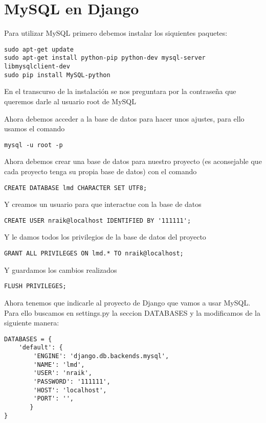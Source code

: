 \section{MySQL en Django}

Para utilizar MySQL primero debemos instalar los siquientes paquetes:

\lstset{
  language=Bash,
}
\begin{lstlisting}
sudo apt-get update
sudo apt-get install python-pip python-dev mysql-server libmysqlclient-dev
sudo pip install MySQL-python
\end{lstlisting}


En el transcurso de la instalación se nos preguntara por la contraseña que queremos darle al usuario root de MySQL

Ahora debemos acceder a la base de datos para hacer unos ajustes, para ello usamos el comando


\begin{lstlisting}
mysql -u root -p
\end{lstlisting}

Ahora debemos crear una base de datos para nuestro proyecto (es aconsejable que cada proyecto tenga su propia base de datos) con el comando


\lstset{
  language=sql,
}
\begin{lstlisting}
CREATE DATABASE lmd CHARACTER SET UTF8;
\end{lstlisting}

Y creamos un usuario para que interactue con la base de datos

\begin{lstlisting}
CREATE USER nraik@localhost IDENTIFIED BY '111111';
\end{lstlisting}


Y le damos todos los privilegios de la base de datos del proyecto

\begin{lstlisting}
GRANT ALL PRIVILEGES ON lmd.* TO nraik@localhost;
\end{lstlisting}
Y guardamos los cambios realizados

\begin{lstlisting}
FLUSH PRIVILEGES;
\end{lstlisting}


Ahora tenemos que indicarle al proyecto de Django que vamos a usar MySQL. Para ello buscamos en settings.py la seccion DATABASES y la modificamos de la siguiente manera:

\lstset{
  language=Python,
}
\begin{lstlisting}
DATABASES = {
    'default': {
        'ENGINE': 'django.db.backends.mysql',
        'NAME': 'lmd',
        'USER': 'nraik',
        'PASSWORD': '111111',
        'HOST': 'localhost',
        'PORT': '',
       }
}
\end{lstlisting}

